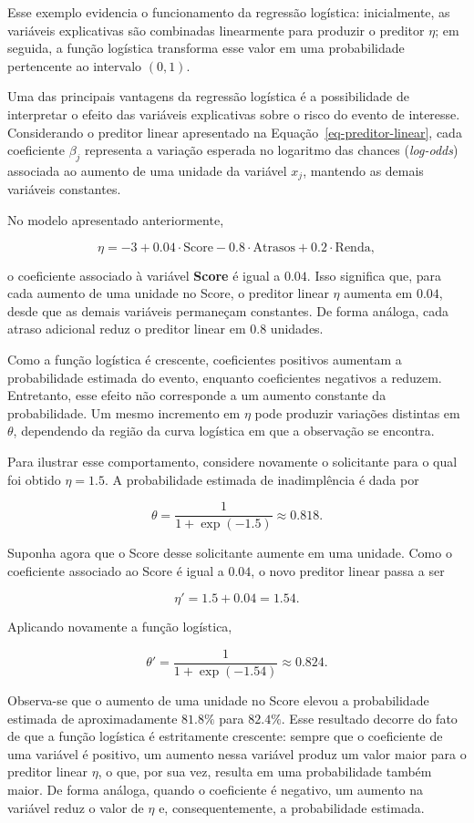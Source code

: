 \documentclass[
  brazilian,
  12pt,
  letterpaper,
  DIV=11,
  numbers=noendperiod]{scrartcl}
\begin{document}
Esse exemplo evidencia o funcionamento da regressão logística:
inicialmente, as variáveis explicativas são combinadas linearmente para
produzir o preditor \(\eta\); em seguida, a função logística transforma
esse valor em uma probabilidade pertencente ao intervalo \((0,1)\).

Uma das principais vantagens da regressão logística é a possibilidade de
interpretar o efeito das variáveis explicativas sobre o risco do evento
de interesse. Considerando o preditor linear apresentado na
Equação~\ref{eq-preditor-linear}, cada coeficiente \(\beta_j\)
representa a variação esperada no logaritmo das chances
(\emph{log-odds}) associada ao aumento de uma unidade da variável
\(x_j\), mantendo as demais variáveis constantes.

No modelo apresentado anteriormente,

\[
\eta = -3 + 0.04 \cdot \text{Score} - 0.8 \cdot \text{Atrasos} + 0.2 \cdot \text{Renda},
\]

o coeficiente associado à variável \textbf{Score} é igual a \(0.04\).
Isso significa que, para cada aumento de uma unidade no Score, o
preditor linear \(\eta\) aumenta em \(0.04\), desde que as demais
variáveis permaneçam constantes. De forma análoga, cada atraso adicional
reduz o preditor linear em \(0.8\) unidades.

Como a função logística é crescente, coeficientes positivos aumentam a
probabilidade estimada do evento, enquanto coeficientes negativos a
reduzem. Entretanto, esse efeito não corresponde a um aumento constante
da probabilidade. Um mesmo incremento em \(\eta\) pode produzir
variações distintas em \(\theta\), dependendo da região da curva
logística em que a observação se encontra.

Para ilustrar esse comportamento, considere novamente o solicitante para
o qual foi obtido \(\eta = 1.5\). A probabilidade estimada de
inadimplência é dada por

\[
\theta=\frac{1}{1+\exp(-1.5)}\approx0.818.
\]

Suponha agora que o Score desse solicitante aumente em uma unidade. Como
o coeficiente associado ao Score é igual a \(0.04\), o novo preditor
linear passa a ser

\[
\eta' = 1.5 + 0.04 = 1.54.
\]

Aplicando novamente a função logística,

\[
\theta'=\frac{1}{1+\exp(-1.54)}\approx0.824.
\]

Observa-se que o aumento de uma unidade no Score elevou a probabilidade
estimada de aproximadamente \(81.8\%\) para \(82.4\%\). Esse resultado
decorre do fato de que a função logística é estritamente crescente:
sempre que o coeficiente de uma variável é positivo, um aumento nessa
variável produz um valor maior para o preditor linear \(\eta\), o que,
por sua vez, resulta em uma probabilidade também maior. De forma
análoga, quando o coeficiente é negativo, um aumento na variável reduz o
valor de \(\eta\) e, consequentemente, a probabilidade estimada.
\end{document}
